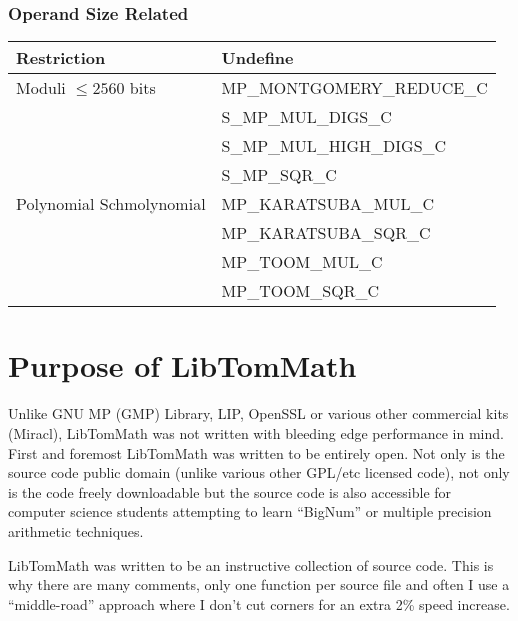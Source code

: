 \documentclass[synpaper]{book}
\begin{document}
\subsubsection{Operand Size Related}
\begin{small}
  \begin{center}
    \begin{tabular}{|l|l|}
      \hline \textbf{Restriction}     & \textbf{Undefine}         \\
      \hline Moduli $\le 2560$ bits   & MP\_MONTGOMERY\_REDUCE\_C \\
                                      & S\_MP\_MUL\_DIGS\_C       \\
                                      & S\_MP\_MUL\_HIGH\_DIGS\_C \\
                                      & S\_MP\_SQR\_C             \\
      \hline Polynomial Schmolynomial & MP\_KARATSUBA\_MUL\_C     \\
                                      & MP\_KARATSUBA\_SQR\_C     \\
                                      & MP\_TOOM\_MUL\_C          \\
                                      & MP\_TOOM\_SQR\_C          \\

      \hline
    \end{tabular}
  \end{center}
\end{small}

\section{Purpose of LibTomMath}
Unlike GNU MP (GMP) Library, LIP, OpenSSL or various other commercial kits (Miracl), LibTomMath
was not written with bleeding edge performance in mind.  First and foremost LibTomMath was written
to be entirely open. Not only is the source code public domain (unlike various other GPL/etc
licensed code), not only is the code freely downloadable but the source code is also accessible for
computer science students attempting to learn ``BigNum'' or multiple precision arithmetic
techniques.

LibTomMath was written to be an instructive collection of source code.  This is why there are many
comments, only one function per source file and often I use a ``middle-road'' approach where I
don't cut corners for an extra 2\% speed increase.
\end{document}
